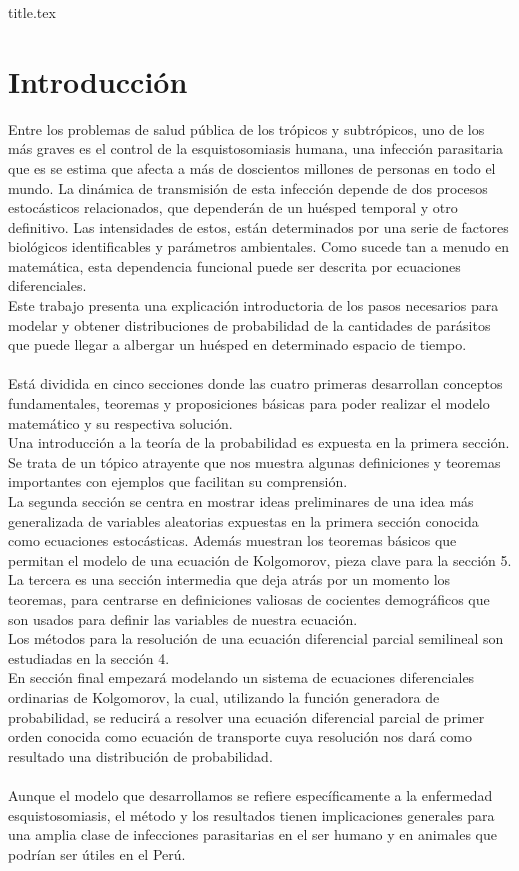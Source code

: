 \documentclass[a4paper,11pt]{book}
\begin{document}
\frontmatter
{title.tex}

\clearpage
\thispagestyle{empty}

\tableofcontents

\mainmatter

\chapter*{Introducción}
Entre los problemas de salud pública de los trópicos y subtrópicos, uno de los más graves es el control de la esquistosomiasis humana, una infección parasitaria que es se estima que afecta a más de doscientos millones de personas en todo el mundo. 
La dinámica de transmisión de esta infección depende de dos procesos estocásticos relacionados, que dependerán de un huésped temporal y otro definitivo. Las intensidades de estos, están determinados por una serie de factores biológicos identificables y parámetros ambientales. Como sucede tan a menudo en matemática, esta dependencia funcional puede ser descrita por ecuaciones diferenciales.\\ 
Este trabajo presenta una explicación introductoria de los pasos necesarios para modelar y obtener distribuciones de probabilidad de la cantidades de parásitos que puede llegar a albergar un huésped en determinado espacio de tiempo.\\ \\
Está dividida en cinco secciones donde las cuatro primeras desarrollan conceptos fundamentales, teoremas y proposiciones básicas para poder realizar el modelo matemático y su respectiva solución.\\
Una introducción a la teoría de la probabilidad es expuesta en la primera sección. Se trata de un tópico atrayente que nos muestra algunas definiciones y teoremas importantes con ejemplos que facilitan su comprensión.\\
La segunda sección se centra en mostrar ideas preliminares de una idea más generalizada de variables aleatorias expuestas en la primera sección conocida como ecuaciones estocásticas. Además muestran los teoremas básicos que permitan el modelo de una ecuación de Kolgomorov, pieza clave para la sección 5.\\
La tercera es una sección intermedia que deja atrás por un momento los teoremas, para centrarse en definiciones valiosas de cocientes demográficos que son usados para definir las variables de nuestra ecuación.\\
Los métodos para la resolución de una ecuación diferencial parcial semilineal son estudiadas en la sección 4.\\
En sección final empezará modelando un sistema de ecuaciones diferenciales ordinarias de Kolgomorov, la cual, utilizando la función generadora de probabilidad, se reducirá a resolver una ecuación diferencial parcial de primer orden conocida como ecuación de transporte cuya resolución nos dará como resultado una distribución de probabilidad.\\ \\
Aunque el modelo que desarrollamos se refiere específicamente a la enfermedad esquistosomiasis, el método y los resultados tienen implicaciones generales para una amplia clase de infecciones parasitarias en el ser humano y en animales que podrían ser útiles en el Perú.
\end{document}
